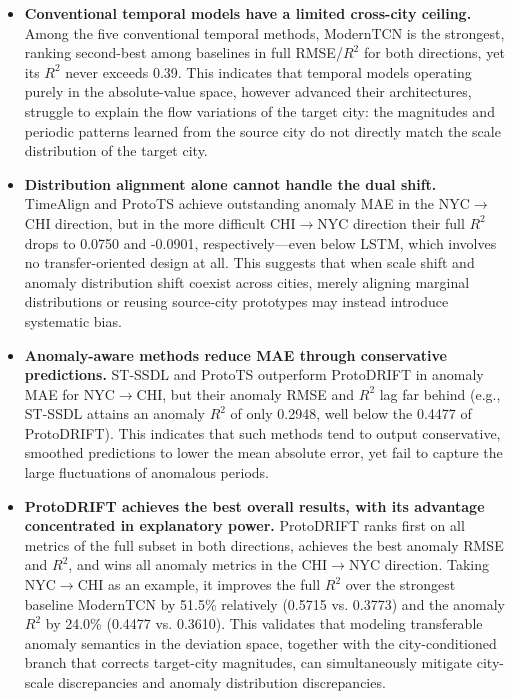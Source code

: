 \begin{itemize}
    \item \textbf{Conventional temporal models have a limited cross-city ceiling.} Among the five conventional temporal methods, ModernTCN is the strongest, ranking second-best among baselines in full RMSE/$R^2$ for both directions, yet its $R^2$ never exceeds 0.39. This indicates that temporal models operating purely in the absolute-value space, however advanced their architectures, struggle to explain the flow variations of the target city: the magnitudes and periodic patterns learned from the source city do not directly match the scale distribution of the target city.
    \item \textbf{Distribution alignment alone cannot handle the dual shift.} TimeAlign and ProtoTS achieve outstanding anomaly MAE in the NYC$\rightarrow$CHI direction, but in the more difficult CHI$\rightarrow$NYC direction their full $R^2$ drops to 0.0750 and -0.0901, respectively—even below LSTM, which involves no transfer-oriented design at all. This suggests that when scale shift and anomaly distribution shift coexist across cities, merely aligning marginal distributions or reusing source-city prototypes may instead introduce systematic bias.
    \item \textbf{Anomaly-aware methods reduce MAE through conservative predictions.} ST-SSDL and ProtoTS outperform ProtoDRIFT in anomaly MAE for NYC$\rightarrow$CHI, but their anomaly RMSE and $R^2$ lag far behind (e.g., ST-SSDL attains an anomaly $R^2$ of only 0.2948, well below the 0.4477 of ProtoDRIFT). This indicates that such methods tend to output conservative, smoothed predictions to lower the mean absolute error, yet fail to capture the large fluctuations of anomalous periods.
    \item \textbf{ProtoDRIFT achieves the best overall results, with its advantage concentrated in explanatory power.} ProtoDRIFT ranks first on all metrics of the full subset in both directions, achieves the best anomaly RMSE and $R^2$, and wins all anomaly metrics in the CHI$\rightarrow$NYC direction. Taking NYC$\rightarrow$CHI as an example, it improves the full $R^2$ over the strongest baseline ModernTCN by 51.5\% relatively (0.5715 vs. 0.3773) and the anomaly $R^2$ by 24.0\% (0.4477 vs. 0.3610). This validates that modeling transferable anomaly semantics in the deviation space, together with the city-conditioned branch that corrects target-city magnitudes, can simultaneously mitigate city-scale discrepancies and anomaly distribution discrepancies.
\end{itemize}

